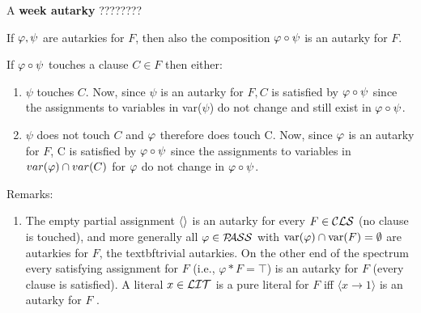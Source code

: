 \documentclass[12pt]{book}
\begin{document}
\begin{defi}\label{def:week autarky}
      A \textbf{week autarky} ????????
\end{defi} 
\begin{lem}\label{lem:compaut}
      If $\varphi, \psi$ are autarkies for $F$, then also the composition $\varphi \circ \psi$ is an autarky for $F$.
\end{lem}
\pr If $\varphi \circ \psi$ touches a clause $C \in F$ then either:
\begin{enumerate}
      \item $\psi$ touches $C$. Now, since $\psi$ is an autarky for $F, C$ is satisfied by $\varphi \circ \psi$ since the assignments to variables in var($\psi$) 
	  do not  change and still exist in $\varphi \circ \psi$. \item $\psi$ does not touch $C$ and $\varphi$ therefore does touch C. Now, since $\varphi$ is an autarky 
	  for $F$, C is satisfied by $\varphi \circ \psi$ since the assignments to variables in $var(\varphi) \cap var(C)$ for $\varphi$ do not change in $\varphi \circ \psi$. 
\end{enumerate}
Remarks:
\begin{enumerate}
      \item The empty partial assignment $\langle  \rangle$ is an autarky for every $F \in \mathcal{CLS}$ (no clause is touched), and more generally all $\varphi \in \mathcal{P\hspace{-0.32em}ASS}$ with $\operatorname{var}(\varphi) \cap \operatorname{var}(F) = \emptyset$
      are autarkies for $F$, the textbf{trivial autarkies}. On the other end of the spectrum every satisfying assignment for $F$ (i.e., $\varphi * F = \top $) is an autarky for $F$ 
	  (every clause is satisfied). A literal $x \in \mathcal{LIT}$ is a pure literal for $F$ iff $\langle x \rightarrow 1 \rangle $ is an autarky for $F$ \cite{h9}.
\end{enumerate}
\end{document}
